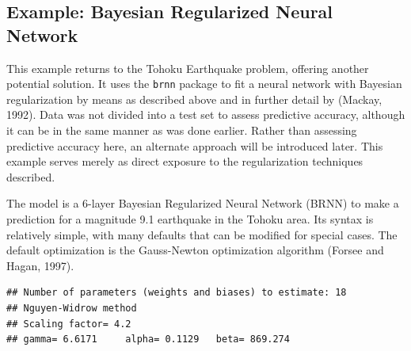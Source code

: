 \subsection{Example: Bayesian Regularized Neural Network}

This example returns to the Tohoku Earthquake problem, offering another potential solution.  It uses the \texttt{brnn} package to fit a neural network with Bayesian regularization by means as described above and in further detail by (Mackay, 1992).  Data was not divided into a test set to assess predictive accuracy, although it can be in the same manner as was done earlier.  Rather than assessing predictive accuracy here, an alternate approach will be introduced later.  This example serves merely as direct exposure to the regularization techniques described.

The model is a 6-layer Bayesian Regularized Neural Network (BRNN) to make a prediction for a magnitude 9.1 earthquake in the Tohoku area.  Its syntax is relatively simple, with many defaults that can be modified for special cases.  The default optimization is the Gauss-Newton optimization algorithm (Forsee and Hagan, 1997).

\begin{Shaded}
\begin{Highlighting}[]
\OtherTok{\textless{}{-}}\SpecialCharTok{$}
\OtherTok{\textless{}{-}}\SpecialCharTok{$}

\OtherTok{\textless{}{-}} \SpecialCharTok{\textasciitilde{}}\NormalTok{)   }
\end{Highlighting}
\end{Shaded}

\begin{verbatim}
## Number of parameters (weights and biases) to estimate: 18 
## Nguyen-Widrow method
## Scaling factor= 4.2 
## gamma= 6.6171     alpha= 0.1129   beta= 869.274
\end{verbatim}

\begin{Shaded}
\begin{Highlighting}[]

\end{Highlighting}
\end{Shaded}

